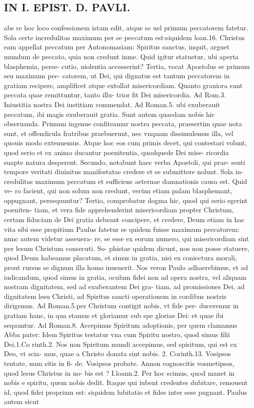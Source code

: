 \documentclass{article}
\begin{document}
\begin{pages}
\section*{IN I. EPIST. D. PAVLI. }
\marginpar{[ p.53 ]}\pstart abs re hoc loco confessionem istam edit, atque se uel primum peccatorem fatetur. Sola certe incredulitas maximum per se peccatum est:siquidem loan.16. Christus eam appellat peccatum per Antonomasiam: Spiritus sanctus, inquit, arguet mundum de   peccato, quia non credunt inme. Quid igitur statuetur, ubi aperta blasphemia, perse- cutio, uiolentia accesserint? Tertia, vocat Apostolus se primum seu maximum pec- catorem, ut Dei, qui dignatus est tantum peccatorem in gratiam recipere, amplificet atque  extollat misericordiam. Quanto grauiora sunt peccata quae remittuntur, tanto illu- trior fit Dei misericordia. Ad Rom.3. Iniustitia nostra Dei iustitiam commendat. Ad Roman.5. ubi exuberauit peccatum, ibi magis exuberauit gratia.  \pend\pstart Sunt autem quaedam nobis hic obseruanda. Primum ingenue confiteamur nostra peccata, praesertim quae nota sunt, et offendicula fratribus praebuerunt, nec vnquam dissimulemus illa, vel quouis modo extenuemus. Atque  hoc eos cum primis decet, qui contestari volunt, quod serio et ex animo ducantur poenitentia, quodquede Dei mise- ricordia suapte natura desperent. Secundo, notabunt haec verba Apostoli, qui prae- senti tempore veritati diuinitus manifestatae credere et se submittere nolunt. Sola in- credulitas maximum peccatum et sufficiens aeternae damnationis causa est. Quid ve- ro facient, qui non solum non credunt, verùm etiam palam blasphemant, oppugnant, persequuntur? Tertio, comprobatur dogma hic, quod qui serio egerint poeniten- tiam, et vera fide apprehenderint misericordiam propter Christum, certam fiduciam de Dei gratia debeant concipere, et credere, Deum etiam in hac vita sibi esse propitium Paulus fatetur se quidem fuisse maximum peccatorem: nunc autem videtur asseuera- re, se esse ex eorum numero, qui misericordiam sint per lesum Christum consecuti. So- phistae quidem dicunt, nos non posse statuere, quod Deum habeamus placatum, et simus in gratia, nisi ex coniectura morali, prout rursus se dignum illa homo inuenerit. Nos veron Paulo adhaerebimus, et ad iudicandum, quod simus in gratia, oculum fidei non ad opera nostra, vel aliquam nostram dignitatem, sed ad exuberantem Dei gra- tiam, ad promissiones Dei, ad dignitatem lesu Christi, ad Spiritus sancti operationem in cordibus nostris dirigemus. Ad Roman.5.per Christum contigit nobis, vt fide per- duceremur in gratiam hanc, in qua stamus et gloriamur sub spe gloriae Dei: et quae ibi sequuntur. Ad Roman.8. Accepimus Spiritum adoptionis, per quem clamamus Abba pater: Idem Spiritus testatur vna cum Spiritu nostro, quod simus filii Dei.1.Co rinth.2. Nos non Spiritum mundi accepimus, sed spiritum, qui est ex Deo, vt scia- mus, quae a Christo donata sint nobis. 2. Corinth.13. Vosipsos tentate, num sitis in fi- de. Vosipsos probate. Annon cognoscitis vosmetipsos, quod lesus Christus in no- bis est ? I.loann.2. Per hoc scimus, quod manet in nobis e spiritu, quem nobis dedit. Itaque  qui iubent credentes dubitare, remouent id, quod fidei proprium est: siquidem lubitatio et fides inter sese pugnant. Paulus autem sicut 
\end{pages}
\end{document}
